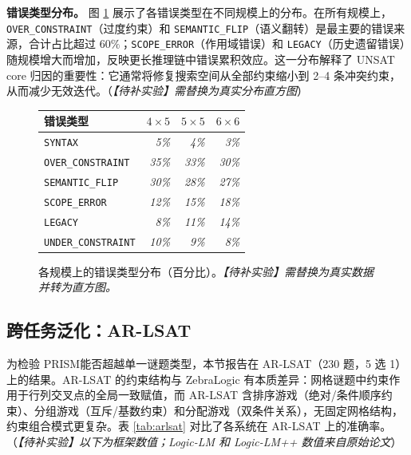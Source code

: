 \documentclass[UTF8,a4paper,12pt]{ctexart}
\newcommand{\PRISM}{PRISM}
\begin{document}
\textbf{错误类型分布。} 图 \ref{fig:error-dist} 展示了各错误类型在不同规模上的分布。在所有规模上，\texttt{OVER\_CONSTRAINT}（过度约束）和 \texttt{SEMANTIC\_FLIP}（语义翻转）是最主要的错误来源，合计占比超过 \(60\%\)；\texttt{SCOPE\_ERROR}（作用域错误）和 \texttt{LEGACY}（历史遗留错误）随规模增大而增加，反映更长推理链中错误累积效应。这一分布解释了 UNSAT core 归因的重要性：它通常将修复搜索空间从全部约束缩小到 2--4 条冲突约束，从而减少无效迭代。（\textit{【待补实验】需替换为真实分布直方图}）

\begin{figure}[t]
  \centering
  \small
  \begin{tabular}{lrrr}
    \toprule
    错误类型 & \(4\times5\) & \(5\times5\) & \(6\times6\) \\
    \midrule
    \texttt{SYNTAX} & \textit{5\%} & \textit{4\%} & \textit{3\%} \\
    \texttt{OVER\_CONSTRAINT} & \textit{35\%} & \textit{33\%} & \textit{30\%} \\
    \texttt{SEMANTIC\_FLIP} & \textit{30\%} & \textit{28\%} & \textit{27\%} \\
    \texttt{SCOPE\_ERROR} & \textit{12\%} & \textit{15\%} & \textit{18\%} \\
    \texttt{LEGACY} & \textit{8\%} & \textit{11\%} & \textit{14\%} \\
    \texttt{UNDER\_CONSTRAINT} & \textit{10\%} & \textit{9\%} & \textit{8\%} \\
    \bottomrule
  \end{tabular}
  \caption{各规模上的错误类型分布（百分比）。\textit{【待补实验】需替换为真实数据并转为直方图。}}
  \label{fig:error-dist}
\end{figure}

\subsection{跨任务泛化：AR-LSAT}
\label{ssec:arlsat}

为检验 \PRISM 能否超越单一谜题类型，本节报告在 AR-LSAT（230 题，5 选 1）上的结果。AR-LSAT 的约束结构与 ZebraLogic 有本质差异：网格谜题中约束作用于行列交叉点的全局一致赋值，而 AR-LSAT 含排序游戏（绝对/条件顺序约束）、分组游戏（互斥/基数约束）和分配游戏（双条件关系），无固定网格结构，约束组合模式更复杂。表 \ref{tab:arlsat} 对比了各系统在 AR-LSAT 上的准确率。（\textit{【待补实验】以下为框架数值；Logic-LM 和 Logic-LM++ 数值来自原始论文}）
\end{document}
